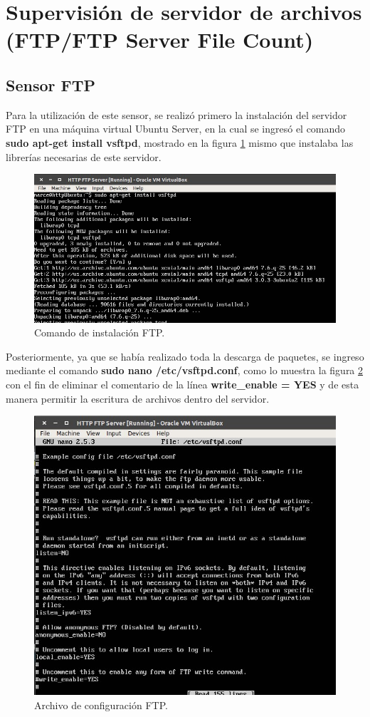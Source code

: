\section{Supervisión de servidor de archivos (FTP/FTP Server File Count)}
\subsection{Sensor FTP}
Para la utilización de este sensor, se realizó primero la instalación del servidor FTP en una máquina virtual Ubuntu Server, en la cual se ingresó el comando \textbf{sudo apt-get install vsftpd}, mostrado en la figura \ref{image:ftp1} mismo que instalaba las librerías necesarias de este servidor.

\FloatBarrier
\begin{figure}[htbp!]
		\centering
			\includegraphics[width=.9 \textwidth]{images/ftp1}
		\caption{Comando de instalación FTP.}
		\label{image:ftp1}
\end{figure}
\FloatBarrier

Posteriormente, ya que se había realizado toda la descarga de paquetes, se ingreso mediante el comando \textbf{sudo nano /etc/vsftpd.conf}, como lo muestra la figura \ref{image:ftp2} con el fin de eliminar el comentario de la línea \textbf{write\_enable = YES} y de esta manera permitir la escritura de archivos dentro del servidor.

\FloatBarrier
\begin{figure}[htbp!]
		\centering
			\includegraphics[width=.75 \textwidth]{images/ftp2}
		\caption{Archivo de configuración FTP.}
		\label{image:ftp2}
\end{figure}
\FloatBarrier

